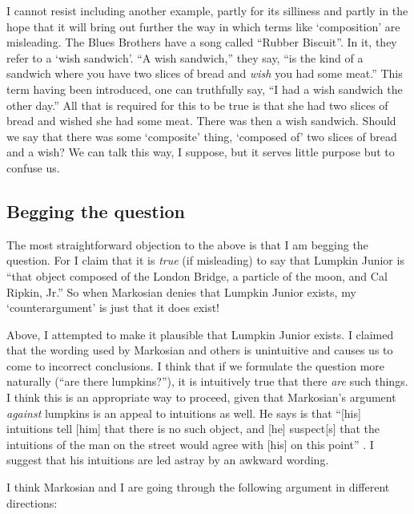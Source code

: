 \documentclass[11pt]{article}
\begin{document}
\begin{spacing}{1.25}
I cannot resist including another example, partly for its silliness
and partly in the hope that it will bring out further the way in which
terms like `composition' are misleading.  The Blues Brothers have a
song called ``Rubber Biscuit''.  In it, they refer to a `wish
sandwich'.  ``A wish sandwich,'' they say, ``is the kind of a sandwich
where you have two slices of bread and {\em wish} you had some meat.''
This term having been introduced, one can truthfully say, ``I had a
wish sandwich the other day.''  All that is required for this to be
true is that she had two slices of bread and wished she had some meat.
There was then a wish sandwich.  Should we say that there was some
`composite' thing, `composed of' two slices of bread and a wish?  We
can talk this way, I suppose, but it serves little purpose but to
confuse us.


\subsection{Begging the question}
\label{beg}
The most straightforward objection to the above is that I am begging
the question.  For I claim that it is {\em true} (if misleading) to
say that Lumpkin Junior is ``that object composed of the London
Bridge, a particle of the moon, and Cal Ripkin, Jr.''  So when
Markosian denies that Lumpkin Junior exists, my `counterargument' is
just that it does exist!

Above, I attempted to make it plausible that Lumpkin Junior exists.  I
claimed that the wording used by Markosian and others is unintuitive
and causes us to come to incorrect conclusions.  I think that if we
formulate the question more naturally (``are there lumpkins?''), it is
intuitively true that there {\em are} such things.  I think this is an
appropriate way to proceed, given that Markosian's argument {\em
  against} lumpkins is an appeal to intuitions as well.  He says is
that ``[his] intuitions tell [him] that there is no such object, and
[he] suspect[s] that the intuitions of the man on the street would
agree with [his] on this point'' \citeyearpar[228]{markosian1998a}.  I
suggest that his intuitions are led astray by an awkward wording.

I think Markosian and I are going through the following argument in
different directions:


\end{spacing}
\end{document}
